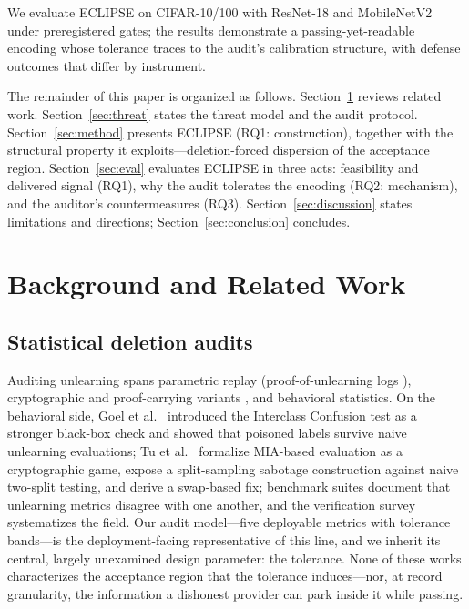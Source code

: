 \documentclass[lettersize,journal]{IEEEtran}
\begin{document}
We evaluate ECLIPSE on CIFAR-10/100 with ResNet-18 and
MobileNetV2 under preregistered gates; the results
demonstrate a passing-yet-readable encoding whose tolerance
traces to the audit's calibration structure, with defense
outcomes that differ by instrument.

The remainder of this paper is organized as follows.
Section~\ref{sec:related} reviews related work.
Section~\ref{sec:threat} states the threat model and the
audit protocol. Section~\ref{sec:method} presents ECLIPSE
(RQ1: construction), together with the structural property
it exploits---deletion-forced dispersion of the acceptance
region. Section~\ref{sec:eval} evaluates ECLIPSE in three
acts: feasibility and delivered signal (RQ1), why the audit
tolerates the encoding (RQ2: mechanism), and the
auditor's countermeasures (RQ3). Section~\ref{sec:discussion}
states limitations and directions; Section~\ref{sec:conclusion}
concludes.

\section{Background and Related Work}\label{sec:related}
\subsection{Statistical deletion audits}
Auditing unlearning spans parametric replay (proof-of-unlearning
logs \cite{thudi2022necessity}), cryptographic and proof-carrying
variants \cite{xue2025survey}, and behavioral statistics. On the
behavioral side, Goel et al.~\cite{goel2022adversarial} introduced
the Interclass Confusion test as a stronger black-box check and
showed that poisoned labels survive naive unlearning evaluations;
Tu et al.~\cite{tu2025reliable} formalize MIA-based evaluation as a
cryptographic game, expose a split-sampling sabotage construction
against naive two-split testing, and derive a swap-based fix;
benchmark suites \cite{dorna2025openunlearning} document that
unlearning metrics disagree with one another, and the verification
survey \cite{xue2025survey} systematizes the field. Our audit
model---five deployable metrics with tolerance bands---is the
deployment-facing representative of this line, and we inherit its
central, largely unexamined design parameter: the tolerance. None of
these works characterizes the acceptance region that the tolerance
induces---nor, at record granularity, the information a dishonest
provider can park inside it while passing.
\end{document}
